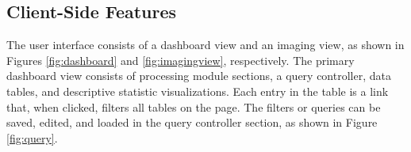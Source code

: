 \subsection{Client-Side Features}
The user interface consists of a dashboard view and an imaging view, as shown in Figures \ref{fig:dashboard} and \ref{fig:imagingview}, respectively. The primary dashboard view consists of processing module sections, a query controller, data tables, and descriptive statistic visualizations. Each entry in the table is a link that, when clicked, filters all tables on the page. The filters or queries can be saved, edited, and loaded in the query controller section, as shown in Figure \ref{fig:query}. 